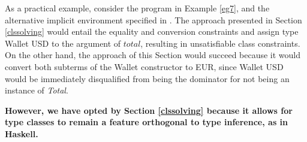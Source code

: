 As a practical example, consider the program in Example \ref{eg7}, and the alternative implicit environment specified in . The approach presented in Section \ref{clssolving} would entail the equality and conversion constraints and assign type Wallet USD to the argument of $total$, resulting in unsatisfiable class constraints. On the other hand, the approach of this Section would succeed because it would convert both subterms of the Wallet constructor to EUR, since Wallet USD would be immediately disqualified from being the dominator for not being an instance of \textit{Total}.

\textbf{However, we have opted by Section \ref{clssolving} because it allows for type classes to remain a feature orthogonal to type inference, as in Haskell.}
